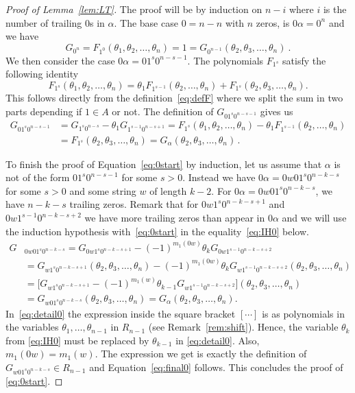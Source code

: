 \documentclass[11pt,oneside]{amsart}
\theoremstyle{definition}
\numberwithin{equation}{section}
\begin{document}
\begin{proof}[Proof of Lemma~\ref{lem:LT}]
The proof will be by induction on $n-i$ where $i$ is the number of trailing $0$s in $\alpha$.
The base case $0=n-n$ with $n$ zeros, is $0\alpha = 0^n$ and we have
\[
G_{0^n} = F_{1^0}(\theta_1,\theta_2 ,\ldots,\theta_n) = 1
= G_{0^{n-1}}(\theta_2, \theta_3, \ldots, \theta_n)~.
\]
We then consider the case  $0\alpha=01^s0^{n-s-1}$. The polynomials $F_{1^s}$ satisfy the  following identity
\begin{equation}\label{eq:relF}
F_{1^s}(\theta_1,\theta_2 ,\ldots,\theta_n)
= \theta_1 F_{1^{s-1}}(\theta_2 ,\ldots,\theta_n) + F_{1^s}(\theta_2,\theta_3 ,\ldots,\theta_n).
\end{equation}
This follows directly from the definition~\eqref{eq:defF} where we split the sum in two parts depending if $1\in A$ or not.
The definition of $G_{01^s0^{n-s-1}}$  gives us
\begin{align*}
	G_{01^s0^{n-s-1}}&= G_{1^s0^{n-s}} - \theta_1 G_{1^{s-1}0^{n-s+1}}
	  =F_{1^s}(\theta_1,\theta_2 ,\ldots,\theta_n) - \theta_1 F_{1^{s-1}}(\theta_2 ,\ldots,\theta_n) \\
	  &= F_{1^s}(\theta_2,\theta_3 ,\ldots,\theta_n)= G_{\alpha}(\theta_2,\theta_3 ,\ldots,\theta_n)\,.
\end{align*}

To finish the  proof of Equation~\eqref{eq:0start} by induction,
let us assume that $\alpha$ is not of the form
$01^s0^{n-s-1}$ for some $s>0$.
Instead we have $0\alpha=0w01^s0^{n-k-s}$ for some $s>0$ and some string $w$
of length $k-2$.
For $0\alpha=0w01^s0^{n-k-s}$, we have $n-k-s$ trailing zeros.
Remark that for $0w1^s0^{n-k-s+1}$ and $0w1^{s-1}0^{n-k-s+2}$
we have more trailing zeros than appear in $0\alpha$ and we will use the
induction hypothesis with~\eqref{eq:0start} in the
equality~\eqref{eq:IH0} below.%
\begin{align}
	G&_{0w01^s0^{n-k-s}}= G_{0w1^s0^{n-k-s+1}} -  (-1)^{m_1(0w)} \theta_k G_{0w1^{s-1}0^{n-k-s+2}} \nonumber \\
	 & = G_{w1^s0^{n-k-s+1}}(\theta_2,\theta_3 ,\ldots,\theta_n) - (-1)^{m_1(0w)} \theta_k G_{w1^{s-1}0^{n-k-s+2}}(\theta_2,\theta_3 ,\ldots,\theta_n) \label{eq:IH0}\\
	 & = \big[G_{w1^s0^{n-k-s+1}} - (-1)^{m_1(w)} \theta_{k-1} G_{w1^{s-1}0^{n-k-s+2}}\big](\theta_2,\theta_3 ,\ldots,\theta_n)\label{eq:detail0}\\
	 & = G_{w01^s0^{n-k-s}} (\theta_2,\theta_3 ,\ldots,\theta_n)
	   = G_{\alpha} (\theta_2,\theta_3 ,\ldots,\theta_n).  \label{eq:final0}
\end{align}
In~\eqref{eq:detail0} the expression inside the square bracket $[\cdots]$ is as polynomials in the variables $\theta_1,\ldots,\theta_{n-1}$ in $R_{n-1}$ (see Remark~\ref{rem:shift}).
Hence, the variable $\theta_{k}$ from \eqref{eq:IH0} must
be replaced by $\theta_{k-1}$ in \eqref{eq:detail0}.
Also, $m_1(0w)=m_1(w)$. The expression we get is exactly the definition of
$G_{w01^s0^{n-k-s}} \in R_{n-1}$ and Equation~\eqref{eq:final0} follows.
This concludes the proof of \eqref{eq:0start}.


\end{proof}
\end{document}
